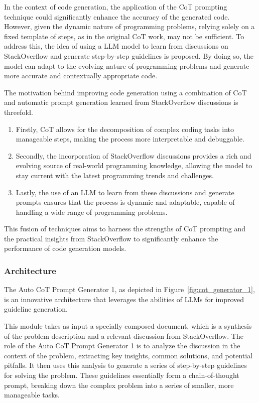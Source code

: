 \documentclass[a4paper,oneside]{book}
\begin{document}
In the context of code generation, the application of the CoT prompting technique could significantly enhance the accuracy of the generated code. However, given the dynamic nature of programming problems, relying solely on a fixed template of steps, as in the original CoT work, may not be sufficient. To address this, the idea of using a LLM model to learn from discussions on StackOverflow and generate step-by-step guidelines is proposed. By doing so, the model can adapt to the evolving nature of programming problems and generate more accurate and contextually appropriate code.

The motivation behind improving code generation using a combination of CoT and automatic prompt generation learned from StackOverflow discussions is threefold.

\begin{enumerate}
    \item Firstly, CoT allows for the decomposition of complex coding tasks into manageable steps, making the process more interpretable and debuggable.
    \item Secondly, the incorporation of StackOverflow discussions provides a rich and evolving source of real-world programming knowledge, allowing the model to stay current with the latest programming trends and challenges.
    \item Lastly, the use of an LLM to learn from these discussions and generate prompts ensures that the process is dynamic and adaptable, capable of handling a wide range of programming problems.
\end{enumerate}

This fusion of techniques aims to harness the strengths of CoT prompting and the practical insights from StackOverflow to significantly enhance the performance of code generation models.

\subsubsection{Architecture}
The Auto CoT Prompt Generator 1, as depicted in Figure~\ref{fig:cot_generator_1}, is an innovative architecture that leverages the abilities of LLMs for improved guideline generation.

This module takes as input a specially composed document, which is a synthesis of the problem description and a relevant discussion from StackOverflow. The role of the Auto CoT Prompt Generator 1 is to analyze the discussion in the context of the problem, extracting key insights, common solutions, and potential pitfalls. It then uses this analysis to generate a series of step-by-step guidelines for solving the problem. These guidelines essentially form a chain-of-thought prompt, breaking down the complex problem into a series of smaller, more manageable tasks.
\end{document}
